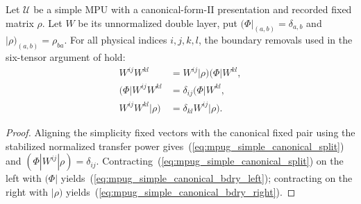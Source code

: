 \begin{lemma}
    \label{thm:mpug_simple_canonical_boundary_contractions}
    \leanok
    Let $\mathcal U$ be a simple MPU with a canonical-form-II presentation
    and recorded fixed matrix $\rho$. Let $W$ be its unnormalized double layer,
    put $(\Phi|_{(a,b)}=\delta_{a,b}$ and
    $|\rho)_{(a,b)}=\rho_{ba}$. For all physical indices $i,j,k,l$, the
    boundary removals used in the six-tensor argument of
    \cite[lines~1164--1254]{FrancoRubio2025MPUGauging} hold:
    \begin{align}
        W^{ij}W^{kl}       & =W^{ij}|\rho)(\Phi|W^{kl},
        \label{eq:mpug_simple_canonical_split}          \\
        (\Phi|W^{ij}W^{kl} & =\delta_{ij}(\Phi|W^{kl},
        \label{eq:mpug_simple_canonical_bdry_left}      \\
        W^{ij}W^{kl}|\rho) & =\delta_{kl}W^{ij}|\rho).
        \label{eq:mpug_simple_canonical_bdry_right}
    \end{align}
\end{lemma}

\begin{proof}\leanok
    Aligning the simplicity fixed vectors with the canonical fixed pair using
    the stabilized normalized transfer power gives~(\ref{eq:mpug_simple_canonical_split}) and
    $(\Phi|W^{ij}|\rho)=\delta_{ij}$. Contracting~(\ref{eq:mpug_simple_canonical_split}) on
    the left with $(\Phi|$ yields~(\ref{eq:mpug_simple_canonical_bdry_left}); contracting on the right with $|\rho)$ yields~(\ref{eq:mpug_simple_canonical_bdry_right}).
\end{proof}

